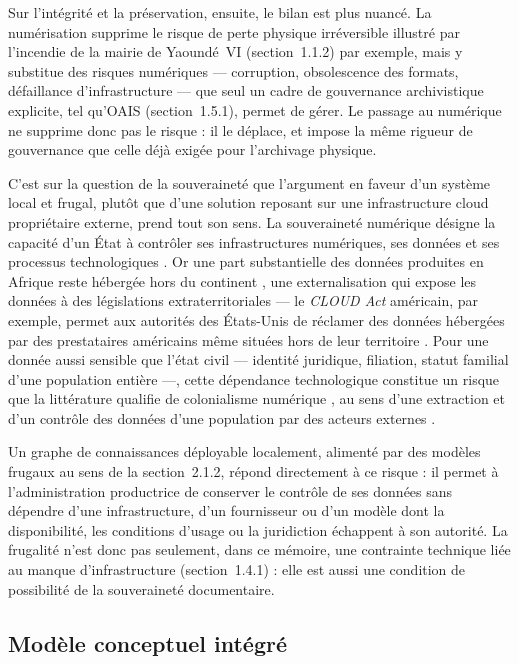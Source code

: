 Sur l'intégrité et la préservation, ensuite, le bilan est plus nuancé. La numérisation supprime le risque de perte physique irréversible illustré par l'incendie de la mairie de Yaoundé~VI (section~1.1.2) par exemple, mais y substitue des risques numériques --- corruption, obsolescence des formats, défaillance d'infrastructure --- que seul un cadre de gouvernance archivistique explicite, tel qu'OAIS (section~1.5.1), permet de gérer.
Le passage au numérique ne supprime donc pas le risque : il le déplace, et impose la même rigueur de gouvernance que celle déjà exigée pour l'archivage physique.

C'est sur la question de la souveraineté que l'argument en faveur d'un système local et frugal, plutôt que d'une solution reposant sur une infrastructure cloud propriétaire externe, prend tout son sens.
La souveraineté numérique désigne la capacité d'un État à contrôler ses infrastructures numériques, ses données et ses processus technologiques \cite{voa2024souverainete,fratini2025sociotechnical}.
Or une part substantielle des données produites en Afrique reste hébergée hors du continent \cite{techinafrica2026datacenters}, une externalisation qui expose les données à des législations extraterritoriales --- le \textit{CLOUD Act} américain, par exemple, permet aux autorités des États-Unis de réclamer des données hébergées par des prestataires américains même situées hors de leur territoire \cite{kone2025souveraineteia}.
Pour une donnée aussi sensible que l'état civil --- identité juridique, filiation, statut familial d'une population entière ---, cette dépendance technologique constitue un risque que la littérature qualifie de \og colonialisme numérique \fg{}, au sens d'une extraction et d'un contrôle des données d'une population par des acteurs externes \cite{coleman2019digitalcolonialism}.

Un graphe de connaissances déployable localement, alimenté par des modèles  frugaux au sens de la section~2.1.2, répond directement à ce risque : il permet à l'administration productrice de conserver le contrôle de ses données sans dépendre d'une infrastructure, d'un fournisseur ou d'un modèle dont la disponibilité, les conditions d'usage ou la juridiction échappent à son autorité.
La frugalité n'est donc pas seulement, dans ce mémoire, une contrainte technique liée au manque d'infrastructure (section~1.4.1) : elle est aussi une condition de possibilité de la souveraineté documentaire.

\subsection{Modèle conceptuel intégré}

